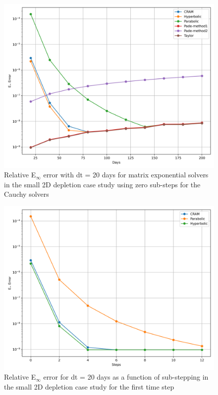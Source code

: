 \begin{figure}[p]
    \centering
    \includegraphics[width=5in]{images/chapter-5/caseStudies/small2DDepletion/msrSmall2DDepletionEinfErrorerrorSteps0.png}
    \caption{Relative E$_{\infty}$ error with dt = 20 days for matrix exponential solvers in the small 2D depletion case study using zero sub-steps for the Cauchy solvers}
    \label{fig:small_2D_depletion_Einf_steps0}
\end{figure}

\clearpage

\begin{figure}[p]
    \centering
    \includegraphics[width=5in]{images/chapter-5/caseStudies/small2DDepletion/msrSmall2DDepletionEinfErrorerrorWithSteps.png}
    \caption{Relative E$_{\infty}$ error for dt = 20 days as a function of sub-stepping in the small 2D depletion case study for the first time step}
    \label{fig:small_2D_depletion_Einf_with_substeps}
\end{figure}

